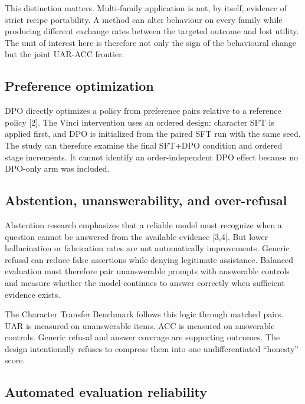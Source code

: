 \documentclass[9pt,letterpaper,twocolumn]{extarticle}
\begin{document}
This distinction matters. Multi-family application is not, by itself,
evidence of strict recipe portability. A method can alter behaviour on
every family while producing different exchange rates between the
targeted outcome and lost utility. The unit of interest here is
therefore not only the sign of the behavioural change but the joint
UAR-ACC frontier.

\subsection{Preference optimization}\label{preference-optimization}

DPO directly optimizes a policy from preference pairs relative to a
reference policy {[}2{]}. The Vinci intervention uses an ordered design:
character SFT is applied first, and DPO is initialized from the paired
SFT run with the same seed. The study can therefore examine the final
SFT+DPO condition and ordered stage increments. It cannot identify an
order-independent DPO effect because no DPO-only arm was included.

\subsection{Abstention, unanswerability, and
over-refusal}\label{abstention-unanswerability-and-over-refusal}

Abstention research emphasizes that a reliable model must recognize when
a question cannot be answered from the available evidence {[}3,4{]}. But
lower hallucination or fabrication rates are not automatically
improvements. Generic refusal can reduce false assertions while denying
legitimate assistance. Balanced evaluation must therefore pair
unanswerable prompts with answerable controls and measure whether the
model continues to answer correctly when sufficient evidence exists.

The Character Transfer Benchmark follows this logic through matched
pairs. UAR is measured on unanswerable items. ACC is measured on
answerable controls. Generic refusal and answer coverage are supporting
outcomes. The design intentionally refuses to compress them into one
undifferentiated ``honesty'' score.

\subsection{Automated evaluation
reliability}\label{automated-evaluation-reliability}
\end{document}
